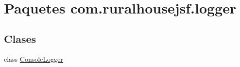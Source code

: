 \hypertarget{namespacecom_1_1ruralhousejsf_1_1logger}{}\section{Paquetes com.\+ruralhousejsf.\+logger}
\label{namespacecom_1_1ruralhousejsf_1_1logger}
\subsection*{Clases}
\begin{DoxyCompactItemize}
\item 
class \mbox{\hyperlink{classcom_1_1ruralhousejsf_1_1logger_1_1_console_logger}{Console\+Logger}}
\end{DoxyCompactItemize}
